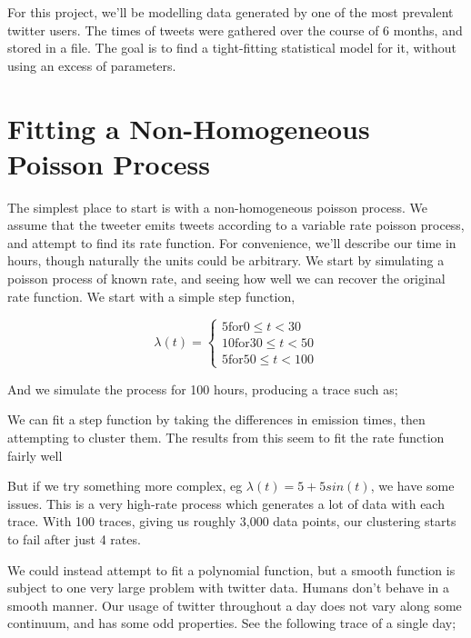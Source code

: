 For this project, we'll be modelling data generated by one of the most prevalent twitter users. The times of tweets were gathered over the course of 6 months, and stored in a file. The goal is to find a tight-fitting statistical model for it, without using an excess of parameters.


\section{Fitting a Non-Homogeneous Poisson Process}

The simplest place to start is with a non-homogeneous poisson process. We assume that the tweeter emits tweets according to a variable rate poisson process, and attempt to find its rate function. For convenience, we'll describe our time in hours, though naturally the units could be arbitrary. We start by simulating a poisson process of known rate, and seeing how well we can recover the original rate function. We start with a simple step function,

$$
\lambda(t) = 
\begin{cases}
5  \mbox{for} 0  \leqslant t < 30\\
10 \mbox{for} 30 \leqslant t < 50\\
5  \mbox{for} 50 \leqslant t < 100
\end{cases}
$$

And we simulate the process for 100 hours, producing a trace such as;


We can fit a step function by taking the differences in emission times, then attempting to cluster them. The results from this seem to fit the rate function fairly well


But if we try something more complex, eg $\lambda(t) = 5+5sin(t)$, we have some issues. This is a very high-rate process which generates a lot of data with each trace. With 100 traces, giving us roughly 3,000 data points, our clustering starts to fail after just 4 rates.

We could instead attempt to fit a polynomial function, but a smooth function is subject to one very large problem with twitter data. Humans don't behave in a smooth manner. Our usage of twitter throughout a day does not vary along some continuum, and has some odd properties. See the following trace of a single day;


